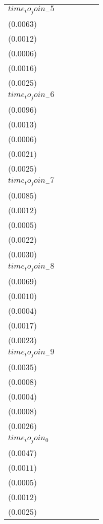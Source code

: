 \begin{tabular}{llllll}
$time_to_join_-5$  &  \makecell{$-0.0010^{}$ \\ ($0.0063$)} &  \makecell{$-0.0004^{}$ \\ ($0.0012$)} &  \makecell{$-0.0004^{}$ \\ ($0.0006$)} &   \makecell{$0.0000^{}$ \\ ($0.0016$)} &   \makecell{$0.0022^{}$ \\ ($0.0025$)} \\
$time_to_join_-6$  &   \makecell{$0.0029^{}$ \\ ($0.0096$)} &  \makecell{$-0.0001^{}$ \\ ($0.0013$)} &  \makecell{$-0.0002^{}$ \\ ($0.0006$)} &   \makecell{$0.0007^{}$ \\ ($0.0021$)} &   \makecell{$0.0021^{}$ \\ ($0.0025$)} \\
$time_to_join_-7$  &   \makecell{$0.0020^{}$ \\ ($0.0085$)} &  \makecell{$-0.0001^{}$ \\ ($0.0012$)} &  \makecell{$-0.0000^{}$ \\ ($0.0005$)} &   \makecell{$0.0010^{}$ \\ ($0.0022$)} &   \makecell{$0.0010^{}$ \\ ($0.0030$)} \\
$time_to_join_-8$  &   \makecell{$0.0049^{}$ \\ ($0.0069$)} &  \makecell{$-0.0001^{}$ \\ ($0.0010$)} &   \makecell{$0.0000^{}$ \\ ($0.0004$)} &   \makecell{$0.0015^{}$ \\ ($0.0017$)} &   \makecell{$0.0019^{}$ \\ ($0.0023$)} \\
$time_to_join_-9$  &  \makecell{$-0.0000^{}$ \\ ($0.0035$)} &  \makecell{$-0.0006^{}$ \\ ($0.0008$)} &   \makecell{$0.0000^{}$ \\ ($0.0004$)} &   \makecell{$0.0001^{}$ \\ ($0.0008$)} &   \makecell{$0.0021^{}$ \\ ($0.0026$)} \\
$time_to_join_0$   &  \makecell{$-0.0060^{}$ \\ ($0.0047$)} &  \makecell{$-0.0006^{}$ \\ ($0.0011$)} &  \makecell{$-0.0003^{}$ \\ ($0.0005$)} &  \makecell{$-0.0012^{}$ \\ ($0.0012$)} &   \makecell{$0.0019^{}$ \\ ($0.0025$)} \\

\end{tabular}
